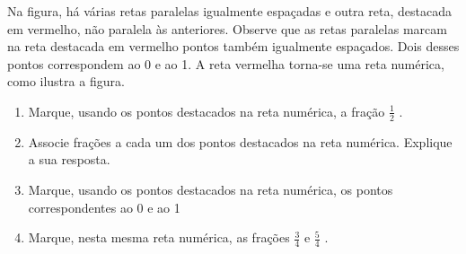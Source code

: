 \documentclass[a4,12pt]{book}
\begin{document}
Na figura, há várias retas paralelas igualmente espaçadas e outra reta, destacada em vermelho, não paralela às anteriores. Observe que as retas paralelas marcam na reta destacada em vermelho pontos também igualmente espaçados. Dois desses pontos correspondem ao 0 e ao 1. A reta vermelha torna-se uma reta numérica, como ilustra a figura. 

\begin{enumerate} [\quad a)] %
  \item     Marque, usando os pontos destacados na reta numérica, a fração     $\frac{1}{2}$    . 
  \item     Associe frações a cada um dos pontos destacados na reta numérica. Explique a sua resposta.    \mbox{} \newline      
\begin{center}
\end{center}

  \item     Marque, usando os pontos destacados na reta numérica, os pontos correspondentes ao 0 e ao 1
  \item     Marque, nesta mesma reta numérica, as frações     $\frac{3}{4}$     e     $\frac{5}{4}$    .
\begin{center}
\end{center}
  
  \end{enumerate} %
\end{document}
